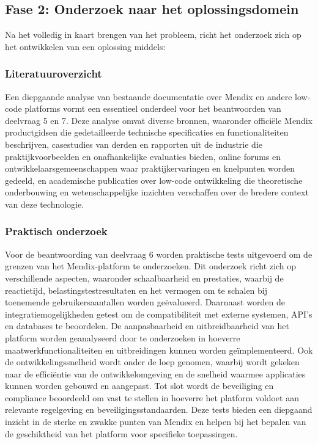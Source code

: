 \subsection{Fase 2: Onderzoek naar het oplossingsdomein}
Na het volledig in kaart brengen van het probleem, richt het onderzoek zich op het ontwikkelen van een oplossing middels:
\subsubsection{Literatuuroverzicht}
Een diepgaande analyse van bestaande documentatie over Mendix en andere low-code platforms vormt een essentieel onderdeel voor het beantwoorden van deelvraag 5 en 7. Deze analyse omvat diverse bronnen, waaronder officiële Mendix productgidsen die gedetailleerde technische specificaties en functionaliteiten beschrijven, casestudies van derden en rapporten uit de industrie die praktijkvoorbeelden en onafhankelijke evaluaties bieden, online forums en ontwikkelaarsgemeenschappen waar praktijkervaringen en knelpunten worden gedeeld, en academische publicaties over low-code ontwikkeling die theoretische onderbouwing en wetenschappelijke inzichten verschaffen over de bredere context van deze technologie.
\subsubsection{Praktisch onderzoek}
Voor de beantwoording van deelvraag 6 worden praktische tests uitgevoerd om de grenzen van het Mendix-platform te onderzoeken. Dit onderzoek richt zich op verschillende aspecten, waaronder schaalbaarheid en prestaties, waarbij de reactietijd, belastingstestresultaten en het vermogen om te schalen bij toenemende gebruikersaantallen worden geëvalueerd. Daarnaast worden de integratiemogelijkheden getest om de compatibiliteit met externe systemen, API’s en databases te beoordelen. De aanpasbaarheid en uitbreidbaarheid van het platform worden geanalyseerd door te onderzoeken in hoeverre maatwerkfunctionaliteiten en uitbreidingen kunnen worden geïmplementeerd. Ook de ontwikkelingssnelheid wordt onder de loep genomen, waarbij wordt gekeken naar de efficiëntie van de ontwikkelomgeving en de snelheid waarmee applicaties kunnen worden gebouwd en aangepast. Tot slot wordt de beveiliging en compliance beoordeeld om vast te stellen in hoeverre het platform voldoet aan relevante regelgeving en beveiligingsstandaarden. Deze tests bieden een diepgaand inzicht in de sterke en zwakke punten van Mendix en helpen bij het bepalen van de geschiktheid van het platform voor specifieke toepassingen.

